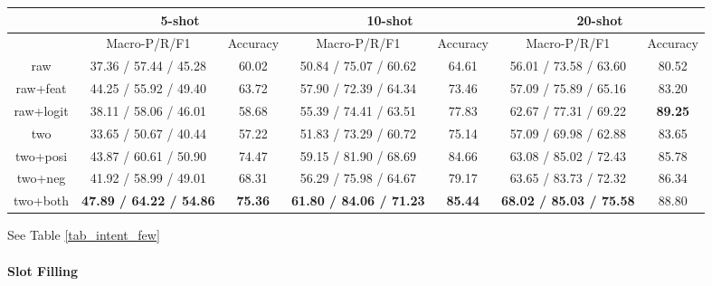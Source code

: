 \begin{table*}
\setlength{\tabcolsep}{0.23em}
\centering
\small{
\begin{tabular}{|c|c|c|c|c|c|c|}

\hline
  & \multicolumn{2}{|c|}{5-shot} & \multicolumn{2}{|c|}{10-shot} & \multicolumn{2}{|c|}{20-shot}  \\
 \hline
  & Macro-P/R/F1 & Accuracy & Macro-P/R/F1 & Accuracy  & Macro-P/R/F1 & Accuracy   \\
\hline
raw & 37.36 / 57.44 / 45.28 & 60.02 & 50.84 / 75.07 / 60.62 & 64.61 & 56.01 / 73.58 / 63.60 & 80.52  \\
\hline
raw+feat & 44.25 / 55.92 / 49.40 & 63.72 & 57.90 / 72.39 / 64.34 & 73.46 & 57.09 / 75.89 / 65.16 & 83.20   \\
\hline
raw+logit & 38.11 / 58.06 / 46.01 & 58.68 & 55.39 / 74.41 / 63.51 & 77.83 & 62.67 / 77.31 / 69.22 & \textbf{89.25} \\
\hline
two & 33.65 / 50.67 / 40.44 & 57.22 & 51.83 / 73.29 / 60.72 & 75.14 & 57.09 / 69.98 / 62.88 & 83.65  \\
\hline
two+posi & 43.87 / 60.61 / 50.90 & 74.47 & 59.15 / 81.90 / 68.69 & 84.66 & 63.08 / 85.02 / 72.43 & 85.78  \\
\hline
two+neg & 41.92 / 58.99 / 49.01 & 68.31 & 56.29 / 75.98 / 64.67 & 79.17 & 63.65 / 83.73 / 72.32 & 86.34   \\
\hline
two+both & \textbf{47.89 / 64.22 / 54.86} & \textbf{75.36} & \textbf{61.80 / 84.06 / 71.23} & \textbf{85.44} & \textbf{68.02 / 85.03 / 75.58} & 88.80   \\
\hline

\end{tabular}
}
\caption{Intent Detection Result on Few-Shot Data}
\label{tab_intent_few}
\end{table*}
See Table \ref{tab_intent_few}


\paragraph{Slot Filling}

